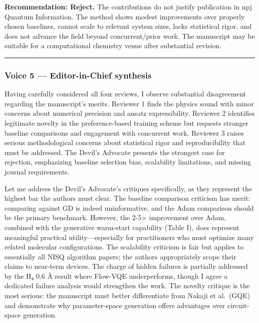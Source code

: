 \documentclass[10pt,letterpaper]{article}
\begin{document}
\textbf{Recommendation: Reject.} The contributions do not justify publication in npj Quantum Information. The method shows modest improvements over properly chosen baselines, cannot scale to relevant system sizes, lacks statistical rigor, and does not advance the field beyond concurrent/prior work. The manuscript may be suitable for a computational chemistry venue after substantial revision.

\begin{center}\rule{0.5\linewidth}{0.5pt}\end{center}

\hypertarget{voice-5-editor-in-chief-synthesis}{%
\subsubsection{Voice 5 --- Editor-in-Chief synthesis}\label{voice-5-editor-in-chief-synthesis}}

Having carefully considered all four reviews, I observe substantial disagreement regarding the manuscript's merits. Reviewer 1 finds the physics sound with minor concerns about numerical precision and ansatz expressibility. Reviewer 2 identifies legitimate novelty in the preference-based training scheme but requests stronger baseline comparisons and engagement with concurrent work. Reviewer 3 raises serious methodological concerns about statistical rigor and reproducibility that must be addressed. The Devil's Advocate presents the strongest case for rejection, emphasizing baseline selection bias, scalability limitations, and missing journal requirements.

Let me address the Devil's Advocate's critiques specifically, as they represent the highest bar the authors must clear. The baseline comparison criticism has merit: comparing against GD is indeed uninformative, and the Adam comparison should be the primary benchmark. However, the 2-5× improvement over Adam, combined with the generative warm-start capability (Table I), does represent meaningful practical utility---especially for practitioners who must optimize many related molecular configurations. The scalability criticism is fair but applies to essentially all NISQ algorithm papers; the authors appropriately scope their claims to near-term devices. The charge of hidden failures is partially addressed by the H₄ 0.6 Å result where Flow-VQE underperforms, though I agree a dedicated failure analysis would strengthen the work. The novelty critique is the most serious: the manuscript must better differentiate from Nakaji et al.~(GQE) and demonstrate why parameter-space generation offers advantages over circuit-space generation.
\end{document}
